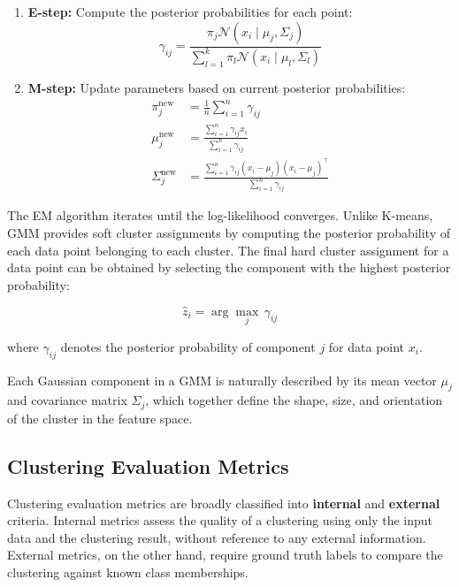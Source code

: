 \begin{enumerate}
    \item \textbf{E-step:} Compute the posterior probabilities for each point:
          \begin{equation}
              \gamma_{ij} = \frac{\pi_j \mathcal{N}(x_i \mid \mu_j, \Sigma_j)}
              {\sum_{l=1}^{k} \pi_l \mathcal{N}(x_i \mid \mu_l, \Sigma_l)}
          \end{equation}

    \item \textbf{M-step:} Update parameters based on current posterior probabilities:
          \begin{align}
              \pi_j^{\text{new}}    & = \frac{1}{n} \sum_{i=1}^{n} \gamma_{ij}                            \\
              \mu_j^{\text{new}}    & = \frac{\sum_{i=1}^{n} \gamma_{ij} x_i}{\sum_{i=1}^{n} \gamma_{ij}} \\
              \Sigma_j^{\text{new}} & = \frac{\sum_{i=1}^{n} \gamma_{ij}(x_i - \mu_j)(x_i - \mu_j)^\top}
              {\sum_{i=1}^{n} \gamma_{ij}}
          \end{align}
\end{enumerate}

The EM algorithm iterates until the log-likelihood converges. Unlike K-means,
GMM provides soft cluster assignments by computing the posterior probability of
each data point belonging to each cluster. The final hard cluster assignment
for a data point can be obtained by selecting the component with the highest
posterior probability:

\begin{equation}
    \hat{z}_i = \arg\max_{j} \, \gamma_{ij}
\end{equation}

where $\gamma_{ij}$ denotes the posterior probability of component $j$ for data
point $x_i$.

Each Gaussian component in a GMM is naturally described by its mean vector
$\mu_j$ and covariance matrix $\Sigma_j$, which together define the shape,
size, and orientation of the cluster in the feature space.

\subsection{Clustering Evaluation Metrics}

Clustering evaluation metrics are broadly classified into \textbf{internal} and
\textbf{external} criteria. Internal metrics assess the quality of a clustering
using only the input data and the clustering result, without reference to any
external information. External metrics, on the other hand, require ground truth
labels to compare the clustering against known class memberships.

